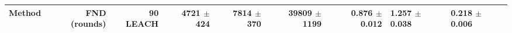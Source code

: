 \begin{tabular}{lrrrrrr}
\toprule
Method & FND (rounds) & 90 %
\midrule
LEACH & 4721 $\pm$ 424 & 7814 $\pm$ 370 & 39809 $\pm$ 1199 & 0.876 $\pm$ 0.012 & 1.257 $\pm$ 0.038 & 0.218 $\pm$ 0.006 \\
\bottomrule
\end{tabular}